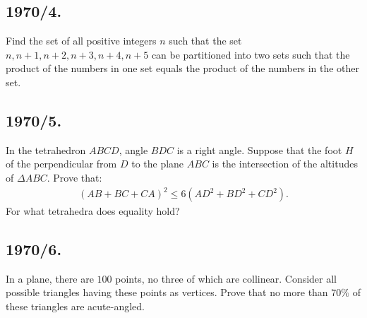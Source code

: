 \documentclass{article}
\begin{document}
\subsection*{1970/4.}
Find the set of all positive integers $ n $ such that the set $ {n, n+1, n+2, n+3, n+4, n+5} $ can be partitioned into two sets such that the product of the numbers in one set equals the product of the numbers in the other set.

\subsection*{1970/5.}
In the tetrahedron $ ABCD $, angle $ BDC $ is a right angle. Suppose that the foot $ H $ of the perpendicular from $ D $ to the plane $ ABC $ is the intersection of the altitudes of $ \Delta ABC $. Prove that:
\begin{align}
	(AB + BC + CA)^2 \leq 6(AD^2 + BD^2 + CD^2).
\end{align}
For what tetrahedra does equality hold?

\subsection*{1970/6.}
In a plane, there are $100$ points, no three of which are collinear. Consider all possible triangles having these points as vertices. Prove that no more than $70\%$ of these triangles are acute-angled.
\end{document}
